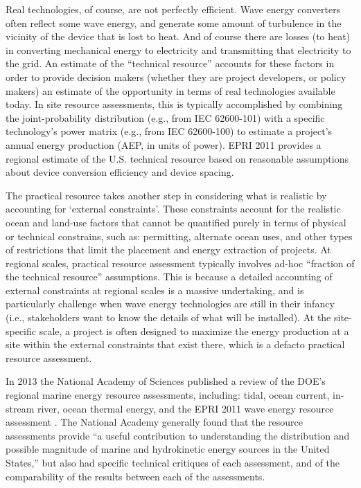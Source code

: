 Real technologies, of course, are not perfectly efficient. Wave energy converters often reflect some wave energy, and generate some amount of turbulence in the vicinity of the device that is lost to heat. And of course there are losses (to heat) in converting mechanical energy to electricity and transmitting that electricity to the grid. An estimate of the ``technical resource'' accounts for these factors in order to provide decision makers (whether they are project developers, or policy makers) an estimate of the opportunity in terms of real technologies available today. In site resource assessments, this is typically accomplished by combining the joint-probability distribution (e.g., from IEC 62600-101) with a specific technology's power matrix (e.g., from IEC 62600-100) to estimate a project's annual energy production (AEP, in units of power).
EPRI 2011 provides a regional estimate of the U.S. technical resource based on reasonable assumptions about device conversion efficiency and device spacing.

The practical resource takes another step in considering what is realistic by accounting for `external constraints'. These constraints account for the realistic ocean and land-use factors that cannot be quantified purely in terms of physical or technical constrains, such as: permitting, alternate ocean uses, and other types of restrictions that limit the placement and energy extraction of projects. At regional scales, practical resource assessment typically involves ad-hoc ``fraction of the technical resource'' assumptions. This is because a detailed accounting of external constraints at regional scales is a massive undertaking, and is particularly challenge when wave energy technologies are still in their infancy (i.e., stakeholders want to know the details of what will be installed). At the site-specific scale, a project is often designed to maximize the energy production at a site within the external constraints that exist there, which is a defacto practical resource assessment.

In 2013 the National Academy of
Sciences published a review of the DOE’s regional marine energy resource
assessments, including: tidal, ocean current, in-stream river, ocean
thermal energy, and the EPRI 2011 wave energy resource assessment
\citep{nationalresearchcouncilEvaluationDepartmentEnergy2013}.  The
National Academy generally found that the resource assessments provide
“a useful contribution to understanding the distribution and possible
magnitude of marine and hydrokinetic energy sources in the United
States,” but also had specific technical critiques of each assessment,
and of the comparability of the results between each of the
assessments.

